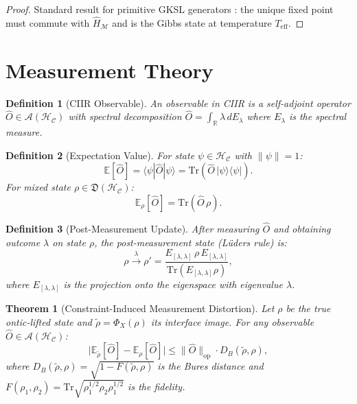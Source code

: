 \documentclass[twocolumn,aps,prd,superscriptaddress,nofootinbib]{revtex4-2}
\newtheorem{theorem}{Theorem}[section]
\newtheorem{definition}{Definition}[section]
\newcommand{\HC}{\mathcal{H}_{\mathcal{C}}}
\newcommand{\CM}{\mathcal{M}}
\newcommand{\CA}{\mathcal{A}}
\newcommand{\hatH}{\hat{H}}
\newcommand{\hatO}{\hat{O}}
\newcommand{\ket}[1]{|#1\rangle}
\newcommand{\bra}[1]{\langle #1|}
\newcommand{\Tr}{\mathrm{Tr}}
\begin{document}
\begin{proof}
Standard result for primitive GKSL generators
\cite{Spohn1977,Frigerio1978}: the unique fixed point must commute with
$\hatH_\CM$ and is the Gibbs state at temperature $T_\mathrm{eff}$.
\end{proof}

\section{Measurement Theory}
\label{sec:measurement}

\begin{definition}[CIIR Observable]
An \emph{observable} in CIIR is a self-adjoint operator $\hatO \in \CA(\HC)$
with spectral decomposition $\hatO = \int_\mathbb{R} \lambda\,dE_\lambda$
where $E_\lambda$ is the spectral measure.
\end{definition}

\begin{definition}[Expectation Value]
For state $\psi \in \HC$ with $\|\psi\|=1$:
\begin{equation}
  \mathbb{E}[\hatO] = \bra{\psi}\hatO\ket{\psi} = \Tr(\hatO\,\ket{\psi}\bra{\psi}).
  \label{eq:expectation}
\end{equation}
For mixed state $\rho \in \mathfrak{D}(\HC)$:
\begin{equation}
  \mathbb{E}_\rho[\hatO] = \Tr(\hatO\,\rho).
  \label{eq:expectation_mixed}
\end{equation}
\end{definition}

\begin{definition}[Post-Measurement Update]
After measuring $\hatO$ and obtaining outcome $\lambda$ on state $\rho$, the
post-measurement state (L{\"u}ders rule) is:
\begin{equation}
  \rho \xrightarrow{\lambda} \rho' = \frac{E_{[\lambda,\lambda]}\,\rho\,E_{[\lambda,\lambda]}}{\Tr(E_{[\lambda,\lambda]}\rho)},
  \label{eq:collapse}
\end{equation}
where $E_{[\lambda,\lambda]}$ is the projection onto the eigenspace with eigenvalue $\lambda$.
\end{definition}

\begin{theorem}[Constraint-Induced Measurement Distortion]
\label{thm:distortion}
Let $\rho$ be the true ontic-lifted state and $\tilde\rho = \Phi_X(\rho)$ its
interface image.  For any observable $\hatO \in \CA(\HC)$:
\begin{equation}
  \bigl|\mathbb{E}_{\tilde\rho}[\hatO] - \mathbb{E}_\rho[\hatO]\bigr|
    \leq \|\hatO\|_{\mathrm{op}} \cdot D_B(\tilde\rho, \rho),
  \label{eq:distortion}
\end{equation}
where $D_B(\tilde\rho,\rho) = \sqrt{1 - F(\tilde\rho,\rho)}$ is the
Bures distance and $F(\rho_1,\rho_2) = \Tr\sqrt{\rho_1^{1/2}\rho_2\rho_1^{1/2}}$
is the fidelity.
\end{theorem}
\end{document}
